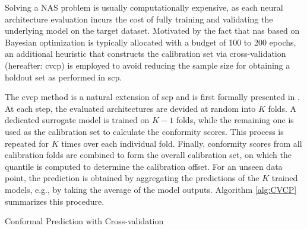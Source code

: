Solving a NAS problem is usually computationally expensive, as each neural architecture evaluation incurs the cost of fully training and validating the underlying model on the target dataset. Motivated by the fact that \gls{nas} based on Bayesian optimization is typically allocated with a budget of 100 to 200 epochs, an additional heuristic that constructs the calibration set via cross-validation (hereafter: \gls{cvcp}) is employed to avoid reducing the sample size for obtaining a holdout set as performed in \gls{scp}.

The \gls{cvcp} method is a natural extension of \gls{scp} and is first formally presented in  \cite{vovk2015cross}. At each step, the evaluated architectures are devided at random into $K$ folds. A dedicated surrogate model is trained on $K-1$ folds, while the remaining one is used as the calibration set to calculate the conformity scores. This process is repeated for $K$ times over each individual fold. Finally, conformity scores from all calibration folds are combined to form the overall calibration set, on which the quantile is computed to determine the calibration offset. For an unseen data point, the prediction is obtained by aggregating the predictions of the $K$ trained models, e.g., by taking the average of the model outputs.  Algorithm \ref{alg:CVCP} summarizes this procedure. 

\vspace{1em}
\begin{algorithm}[t]
  \caption{Conformal Prediction with Cross-validation}
  \label{alg:CVCP}
  \begin{algorithmic}[1]
    \textbf{Input:} 
    A set of observations $\{(x_{i}, y_{i})\}_{i=1}^n$, number of folds $K$, a prediction algorithm $h(\cdot)$, a non-conformity measure $\myfunc{s(\cdot)}$, nominal mis-coverage rate $\tau$, test data $x_{n+1}$. \vskip
    \textbf{Output:} a prediction set $\mathcal{C}_{\tau}(x_{n+1})}$ that covers $y_{n+1}$ with probability $1-\tau$. \vskip
    \vspace{0.5em}
    \STATE Initialise a conformity scoring set $S=\emptyset$
    \STATE Split the observations $\{(x_{i}, y_{i})\}_{i=1}^n$ into $K$ folds at random. $I_k$ denotes the index set containing indices of samples in the $k$-th fold.
    \FOR {$k$ in 1, 2, ..., K}
		\begin{enumerate}
    		\item Train $\hat{h}_{-k}(\cdot)$ on $\{(x_{i}, y_{i}) \mid i \notin I_k\}$
    		\item Compute conformity score on the $k$-th fold $S_k=\{s((\hat{h}_{-k}(x_{i}), y_i) \mid i \in I_k\}$
    		\item $S \leftarrow{S \cup S_k}$
    	\end{enumerate}
   	\ENDFOR
	\STATE Predict $x_{n+1}$: $h(x_{n+1}) \leftarrow aggregate(\{\hat{h}_{-1}(x_{n+1}), ..., \hat{h}_{-K}(x_{n+1})\})$ 
	\STATE Return $\mathcal{C}_{\tau}(x_{n+1}) \leftarrow \{y \,|\, s((h(x_{n+1}), y) \leq q\}$, where $q$ is the $\lceil(1-\tau)(n_s+1)\rceil$-th smallest value of $S$, with $n_s = |S|$.
    \end{algorithmic}
\end{algorithm}

